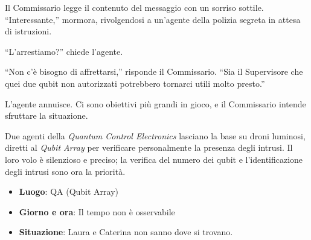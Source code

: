 Il Commissario legge il contenuto del messaggio con un sorriso sottile. ``Interessante,'' mormora, rivolgendosi a un'agente della polizia segreta in attesa di istruzioni.

``L'arrestiamo?'' chiede l'agente.

``Non c'è bisogno di affrettarsi,'' risponde il Commissario. ``Sia il Supervisore che quei due qubit non autorizzati potrebbero tornarci utili molto presto.''

L'agente annuisce. Ci sono obiettivi più grandi in gioco, e il Commissario intende sfruttare la situazione.

Due agenti della \textit{Quantum Control Electronics} lasciano la base su droni luminosi, diretti al \textit{Qubit Array} per verificare personalmente la presenza degli intrusi. Il loro volo è silenzioso e preciso; la verifica del numero dei qubit e l'identificazione degli intrusi sono ora la priorità.


\begin{tcolorbox}[colback=gray!5,colframe=gray!80,title=\textbf{Scheda Informativa}]
\begin{itemize}
    \item \textbf{Luogo}: QA (Qubit Array)
    \item \textbf{Giorno e ora}: Il tempo non è osservabile
    \item \textbf{Situazione}: Laura e Caterina non sanno dove si trovano.
\end{itemize}
\end{tcolorbox}

